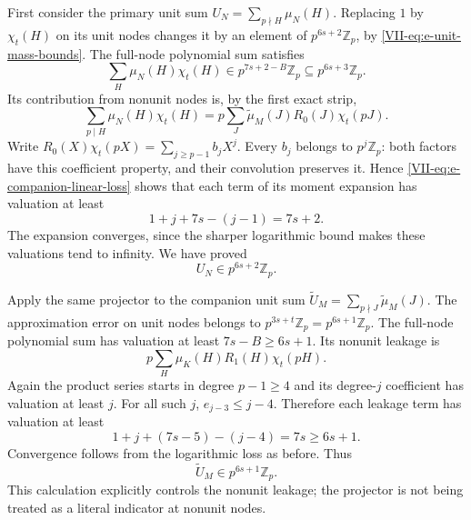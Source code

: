 \documentclass[11pt,letterpaper]{article}
\numberwithin{equation}{section}
\begin{document}
First consider the primary unit sum
$U_N=\sum_{p\nmid H}\mu_N(H)$.
Replacing $1$ by $\chi_t(H)$ on its unit nodes changes it by an
element of $p^{6s+2}\mathbb Z_p$, by
\eqref{VII-eq:e-unit-mass-bounds}. The full-node polynomial sum satisfies
\[
 \sum_H\mu_N(H)\chi_t(H)\in p^{7s+2-B}\mathbb Z_p
                              \subseteq p^{6s+3}\mathbb Z_p.
\]
Its contribution from nonunit nodes is, by the first exact strip,
\[
 \sum_{p\mid H}\mu_N(H)\chi_t(H)
   =p\sum_J\widetilde\mu_M(J)R_0(J)\chi_t(pJ).
\]
Write $R_0(X)\chi_t(pX)=\sum_{j\ge p-1}b_jX^j$.
Every $b_j$ belongs to $p^j\mathbb Z_p$: both factors have this
coefficient property, and their convolution preserves it. Hence
\eqref{VII-eq:e-companion-linear-loss} shows that each term of its
moment expansion has valuation at least
\[
 1+j+7s-(j-1)=7s+2.
\]
The expansion converges, since the sharper logarithmic bound makes
these valuations tend to infinity. We have proved
\begin{equation}\label{VII-eq:e-primary-unit-sum}
 U_N\in p^{6s+2}\mathbb Z_p.
\end{equation}

Apply the same projector to the companion unit sum
$\widetilde U_M=\sum_{p\nmid J}\widetilde\mu_M(J)$.
The approximation error on unit nodes belongs to
$p^{3s+t}\mathbb Z_p=p^{6s+1}\mathbb Z_p$.
The full-node polynomial sum has valuation at least
$7s-B\ge6s+1$. Its nonunit leakage is
\[
 p\sum_H\mu_K(H)R_1(H)\chi_t(pH).
\]
Again the product series starts in degree $p-1\ge4$ and its
degree-$j$ coefficient has valuation at least $j$.
For all such $j$, $e_{j-3}\le j-4$. Therefore each leakage term has
valuation at least
\[
 1+j+(7s-5)-(j-4)=7s\ge6s+1.
\]
Convergence follows from the logarithmic loss as before. Thus
\begin{equation}\label{VII-eq:e-companion-unit-sum}
 \widetilde U_M\in p^{6s+1}\mathbb Z_p.
\end{equation}
This calculation explicitly controls the nonunit leakage; the projector
is not being treated as a literal indicator at nonunit nodes.
\end{document}
